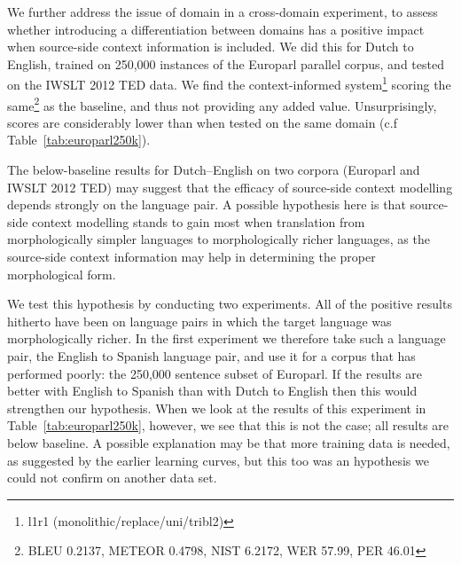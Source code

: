 \documentclass[smallextended]{svjour3}       %
\theoremstyle{break}
\begin{document}
We further address the issue of domain in a cross-domain experiment, to assess
whether introducing a differentiation between domains has a positive impact
when source-side context information is included. We did this for Dutch to
English, trained on 250,000 instances of the Europarl parallel corpus, and
tested on the IWSLT 2012 TED data. We find the context-informed
system\footnote{l1r1 (monolithic/replace/uni/tribl2)} scoring the
same\footnote{BLEU 0.2137, METEOR 0.4798, NIST 6.2172, WER 57.99, PER 46.01} as
the baseline, and thus not providing any added value. Unsurprisingly, scores
are considerably lower than when tested on the same domain (c.f
Table~\ref{tab:europarl250k}).

The below-baseline results for Dutch--English on two corpora (Europarl and IWSLT
2012 TED) may suggest that the efficacy of source-side context modelling
depends strongly on the language pair. A possible hypothesis here is that
source-side context modelling stands to gain most when translation from
morphologically simpler languages to morphologically richer languages, as the
source-side context information may help in determining the proper
morphological form. 

We test this hypothesis by conducting two experiments. All of the positive
results hitherto have been on language pairs in which the target language was
morphologically richer.  In the first experiment we therefore take such a
language pair, the English to Spanish language pair, and use it for a corpus
that has performed poorly: the 250,000 sentence subset of Europarl.  If the
results are better with English to Spanish than with Dutch to English
then this would strengthen our hypothesis. When we look at the results of
this experiment in Table~\ref{tab:europarl250k}, however, we see
that this is not the case; all results are below baseline. A possible
explanation may be that more training data is needed, as suggested by the
earlier learning curves, but this too was an hypothesis we could not confirm on
another data set.
\end{document}
